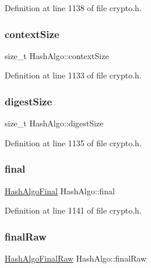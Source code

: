 Definition at line 1138 of file crypto.\+h.

\mbox{\label{structHashAlgo_ad087845190aa4163d8339cacd07fec3e}} 
\subsubsection{\texorpdfstring{context\+Size}{contextSize}}
{\footnotesize\ttfamily size\+\_\+t Hash\+Algo\+::context\+Size}



Definition at line 1133 of file crypto.\+h.

\mbox{\label{structHashAlgo_a0c8ccdb22ea395ccdd8decd06401d22e}} 
\subsubsection{\texorpdfstring{digest\+Size}{digestSize}}
{\footnotesize\ttfamily size\+\_\+t Hash\+Algo\+::digest\+Size}



Definition at line 1135 of file crypto.\+h.

\mbox{\label{structHashAlgo_a8a1972d608540bbf31e1932f5403f51d}} 
\subsubsection{\texorpdfstring{final}{final}}
{\footnotesize\ttfamily \hyperlink{cyclone__crypto_2core_2crypto_8h_a0a272470b5f95692d2e2e882f75844b3}{Hash\+Algo\+Final} Hash\+Algo\+::final}



Definition at line 1141 of file crypto.\+h.

\mbox{\label{structHashAlgo_a6f92d7332b3309e74c45ac10080ed2ed}} 
\subsubsection{\texorpdfstring{final\+Raw}{finalRaw}}
{\footnotesize\ttfamily \hyperlink{cyclone__crypto_2core_2crypto_8h_a07eca3ea605d6ca12e824a9ef890b5ea}{Hash\+Algo\+Final\+Raw} Hash\+Algo\+::final\+Raw}



